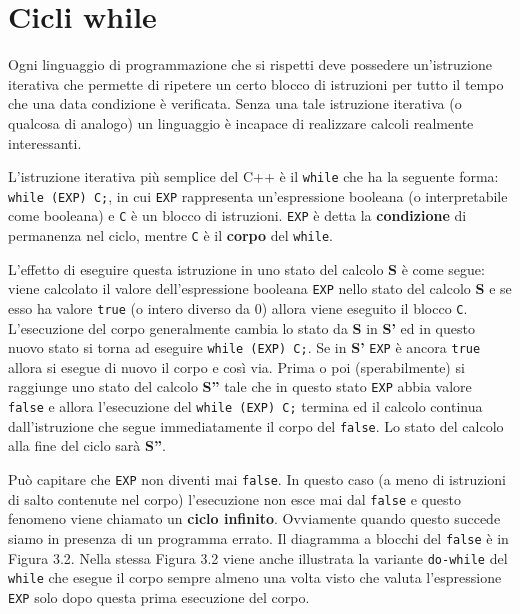 \section{Cicli while}
Ogni linguaggio di programmazione che si rispetti deve possedere un'istruzione iterativa che permette di ripetere un certo blocco di istruzioni per tutto il tempo che una data condizione è verificata.
Senza una tale istruzione iterativa (o qualcosa di analogo) un linguaggio è incapace di realizzare calcoli realmente interessanti.

L'istruzione iterativa più semplice del C++ è il \texttt{while} che ha la seguente forma: \texttt{while (EXP) C;}, in cui \texttt{EXP} rappresenta un'espressione booleana (o interpretabile come booleana) e \texttt{C} è un blocco di istruzioni.
\texttt{EXP} è detta la \textbf{condizione} di permanenza nel ciclo, mentre \texttt{C} è il \textbf{corpo} del \texttt{while}.

L'effetto di eseguire questa istruzione in uno stato del calcolo \textbf{S} è come segue: viene calcolato il valore dell'espressione booleana \texttt{EXP} nello stato del calcolo \textbf{S} e se esso ha valore \texttt{true} (o intero diverso da 0) allora viene eseguito il blocco \texttt{C}.
L'esecuzione del corpo generalmente cambia lo stato da \textbf{S} in \textbf{S'} ed in questo nuovo stato si torna ad eseguire \texttt{while (EXP) C;}.
Se in \textbf{S'} \texttt{EXP} è ancora \texttt{true} allora si esegue di nuovo il corpo e così via.
Prima o poi (sperabilmente) si raggiunge uno stato del calcolo \textbf{S''} tale che in questo stato \texttt{EXP} abbia valore \texttt{false} e allora l'esecuzione del \texttt{while (EXP) C;} termina ed il calcolo continua dall'istruzione che segue immediatamente il corpo del \texttt{false}.
Lo stato del calcolo alla fine del ciclo sarà \textbf{S''}.


Può capitare che \texttt{EXP} non diventi mai \texttt{false}.
In questo caso (a meno di istruzioni di salto contenute nel corpo) l'esecuzione non esce mai dal \texttt{false} e questo fenomeno viene chiamato un \textbf{ciclo infinito}.
Ovviamente quando questo succede siamo in presenza di un programma errato.
Il diagramma a blocchi del \texttt{false} è in Figura 3.2. Nella stessa Figura 3.2 viene anche illustrata la variante \texttt{do-while} del \texttt{while} che esegue il corpo sempre almeno una volta visto che valuta l'espressione \texttt{EXP} solo dopo questa prima esecuzione del corpo. 

